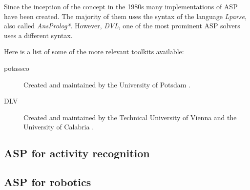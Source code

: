 Since the inception of the concept in the 1980s \citep{Gelf88a} many implementations of ASP have been created.
The majority of them uses the syntax of the language \textit{Lparse}, also called \textit{AnsProlog*}. 
However, \textit{DVL}, one of the most prominent ASP solvers uses a different syntax.

Here is a list of some of the more relevant toolkits available:

\begin{description}
\item[potassco] Created and maintained by the University of Potsdam \citep{gekakaosscsc11a}.
\item[DLV] Created and maintained by the Technical University of Vienna and the University of Calabria \citep{gekakaosscsc11a}.
\end{description}

\subsection{ASP for activity recognition}

\subsection{ASP for robotics}






